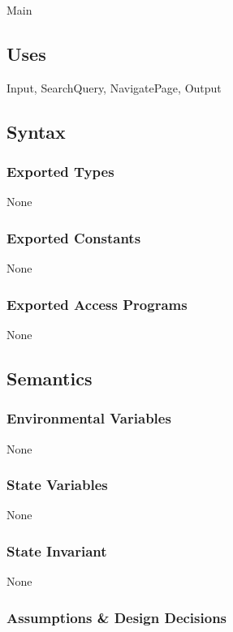 \documentclass{article}
\begin{document}
Main

\subsection* {Uses}

Input, SearchQuery, NavigatePage, Output

\subsection* {Syntax}

\subsubsection* {Exported Types}

None

\subsubsection* {Exported Constants}

None

\subsubsection* {Exported Access Programs}

None

\subsection* {Semantics}

\subsubsection* {Environmental Variables}

None

\subsubsection* {State Variables}

None

\subsubsection* {State Invariant}

None

\subsubsection* {Assumptions \& Design Decisions}
\end{document}
